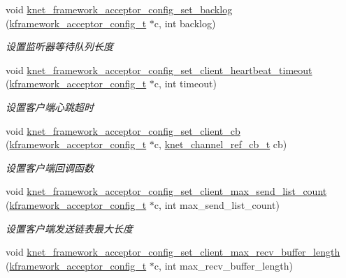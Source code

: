 \begin{DoxyCompactItemize}
void \hyperlink{a00115_gab236e9cd130017f98625904439052b30_gab236e9cd130017f98625904439052b30}{knet\+\_\+framework\+\_\+acceptor\+\_\+config\+\_\+set\+\_\+backlog} (\hyperlink{a00056_a39c993eb450173e4fde04498d757f9b6_a39c993eb450173e4fde04498d757f9b6}{kframework\+\_\+acceptor\+\_\+config\+\_\+t} $\ast$c, int backlog)
\begin{DoxyCompactList}\small\item\em 设置监听器等待队列长度 \end{DoxyCompactList}\item 
void \hyperlink{a00115_ga0f1a47656155b56aa812b07d44a8aa81_ga0f1a47656155b56aa812b07d44a8aa81}{knet\+\_\+framework\+\_\+acceptor\+\_\+config\+\_\+set\+\_\+client\+\_\+heartbeat\+\_\+timeout} (\hyperlink{a00056_a39c993eb450173e4fde04498d757f9b6_a39c993eb450173e4fde04498d757f9b6}{kframework\+\_\+acceptor\+\_\+config\+\_\+t} $\ast$c, int timeout)
\begin{DoxyCompactList}\small\item\em 设置客户端心跳超时 \end{DoxyCompactList}\item 
void \hyperlink{a00115_ga03a86f8b8fc13e6fb8f1ca75e7f14d7a_ga03a86f8b8fc13e6fb8f1ca75e7f14d7a}{knet\+\_\+framework\+\_\+acceptor\+\_\+config\+\_\+set\+\_\+client\+\_\+cb} (\hyperlink{a00056_a39c993eb450173e4fde04498d757f9b6_a39c993eb450173e4fde04498d757f9b6}{kframework\+\_\+acceptor\+\_\+config\+\_\+t} $\ast$c, \hyperlink{a00056_a8a7d96123ef4565c6d08fe58a10476a9_a8a7d96123ef4565c6d08fe58a10476a9}{knet\+\_\+channel\+\_\+ref\+\_\+cb\+\_\+t} cb)
\begin{DoxyCompactList}\small\item\em 设置客户端回调函数 \end{DoxyCompactList}\item 
void \hyperlink{a00115_ga23b21427272c85b9730304add2cbd054_ga23b21427272c85b9730304add2cbd054}{knet\+\_\+framework\+\_\+acceptor\+\_\+config\+\_\+set\+\_\+client\+\_\+max\+\_\+send\+\_\+list\+\_\+count} (\hyperlink{a00056_a39c993eb450173e4fde04498d757f9b6_a39c993eb450173e4fde04498d757f9b6}{kframework\+\_\+acceptor\+\_\+config\+\_\+t} $\ast$c, int max\+\_\+send\+\_\+list\+\_\+count)
\begin{DoxyCompactList}\small\item\em 设置客户端发送链表最大长度 \end{DoxyCompactList}\item 
void \hyperlink{a00115_ga44e90ae8fe6b358dbcd77c447ead94fc_ga44e90ae8fe6b358dbcd77c447ead94fc}{knet\+\_\+framework\+\_\+acceptor\+\_\+config\+\_\+set\+\_\+client\+\_\+max\+\_\+recv\+\_\+buffer\+\_\+length} (\hyperlink{a00056_a39c993eb450173e4fde04498d757f9b6_a39c993eb450173e4fde04498d757f9b6}{kframework\+\_\+acceptor\+\_\+config\+\_\+t} $\ast$c, int max\+\_\+recv\+\_\+buffer\+\_\+length)

\end{DoxyCompactItemize}
